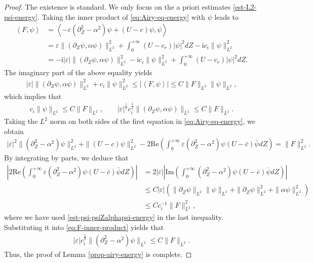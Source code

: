 \documentclass[reqno,11pt]{amsart}
\numberwithin{equation}{section}
\numberwithin{equation}{section}
\theoremstyle{plain}
\begin{document}
\begin{proof}
	The existence is standard. We only focus on the a priori estimates \eqref{est-L2-psi-energy}. Taking the inner product of \eqref{eq:Airy-eq-energy} 
	with $\psi$ leads to
	\begin{align*}
		\left\langle F, {\psi} \right\rangle&=\left\langle -\varepsilon(\partial_Z^2-\alpha^2)\psi+(U-c)\psi, {\psi} \right\rangle\\ &=\varepsilon\|(\partial_Z\psi,\alpha\psi)\|^2_{L^2}+\int_0^{+\infty}(U-c_r)|\psi|^2dZ-\mathrm{i}c_i\|\psi\|^2_{L^2}\\ & =-\mathrm{i}|\varepsilon|\|(\partial_Z\psi,\alpha\psi)\|^2_{L^2}-\mathrm{i}c_i\|\psi\|^2_{L^2}+\int_0^{+\infty}(U-c_r)|\psi|^2dZ.
	\end{align*}
	The imaginary part of the above equality yields
	\begin{align*}
		|\varepsilon|\|(\partial_Z\psi,\alpha\psi)\|^2_{L^2}+c_i\|\psi\|^2_{L^2}\leq \left|\left\langle F, {\psi} \right\rangle\right|\leq C\|F\|_{L^2}\|\psi\|_{L^2},
	\end{align*}
	which implies that
	\begin{align}\label{est-psi-psiZalphapsi-energy}
		c_i\|\psi\|_{L^2}\leq C\|F\|_{L^2},\qquad |\varepsilon|^{\frac{1}{2}}c_i^{\frac12}\|(\partial_Z\psi,\alpha\psi)\|_{L^2}\leq C\|F\|_{L^2}.
	\end{align}
	Taking the $L^2$ norm on both sides of the first equation in \eqref{eq:Airy-eq-energy}, we obtain 
	\begin{align}\label{eq:F-inner-product}
		|\varepsilon|^2\|(\partial_Z^2-\alpha^2)\psi\|_{L^2}^2+\|(U-c)\psi\|_{L^2}^2-2\mathrm{Re}\left(\int_0^{+\infty}\varepsilon(\partial_Z^2-\alpha^2)\psi(U-\bar{c})\bar{\psi}dZ\right)=\|F\|^2_{L^2}.
	\end{align}
	By integrating by parts, we deduce that
	\begin{align*}
		\left|2\mathrm{Re}\left(\int_0^{+\infty}\varepsilon(\partial_Z^2-\alpha^2)\psi(U-\bar{c})\bar{\psi}dZ\right)\right|
		&%
		{=2}|\varepsilon|\left|\mathrm{Im}\left(\int_0^{+\infty}(\partial_Z^2-\alpha^2)\psi(U-\bar{c})\bar{\psi}dZ\right)\right|\\ &\leq C|\varepsilon|\left(\|\partial_Z\psi\|_{L^2}\|\psi\|_{L^2}+\|\partial_Z\psi\|_{L^2}^2+\|\alpha\psi\|^2_{L^2}\right)\\ &\leq Cc_i^{-1}\|F\|_{L^2}^2,
	\end{align*}
	where we have used \eqref{est-psi-psiZalphapsi-energy} in the last inequality. Substituting it into \eqref{eq:F-inner-product} yields that
	\begin{align*}
		|\varepsilon|c_i^{\frac12}\|(\partial_Z^2-\alpha^2)\psi\|_{L^2}\leq C\|F\|_{L^2}.
	\end{align*}
Thus, the proof of Lemma \ref{prop-airy-energy} is complete.
	
\end{proof}
\end{document}
